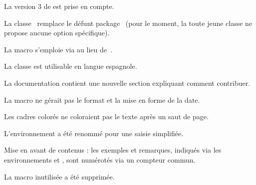 \tdocsep




\begin{tdoctech}[version = 1.5.0, date = 2024-10-19]
    \item La version 3 de  est prise en compte.
\end{tdoctech}

\begin{tdocbreak}
    \item La classe \thisproj\ remplace le défunt package \thisproj\ (pour le moment, la toute jeune classe ne propose aucune option spécifique).

    \item La macro  s'emploie via  au lieu de \,.
\end{tdocbreak}


\begin{tdocnew}
    \item La classe est utilisable en langue espagnole.

    \item La documentation contient une nouvelle section expliquant comment contribuer.
\end{tdocnew}


\begin{tdocfix}
    \item La macro  ne gérait pas le format et la mise en forme de la date.

    \item Les cadres colorés ne coloraient pas le texte après un saut de page.
\end{tdocfix}

\tdocsep




\begin{tdocbreak}[version = 1.4.0, date = 2024-09-28]
    \item L'environnement  a été renommé  pour une saisie simplifiée.

    \item Mise en avant de contenus : les exemples et remarques, indiqués via les environnements  et , sont numérotés via un compteur commun.

    \item La macro inutilisée  a été supprimée.
\end{tdocbreak}


